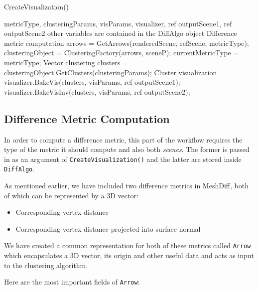 \begin{algorithm}[H]
\caption{CreateVisualization()}
\label{algo:create_vis}
\begin{algorithmic}[1]

\Require metricType, clusteringParams, visParams, visualizer, ref outputScene1, ref outputScene2 \Comment other variables are contained in the DiffAlgo object
\Statex
\Statex \Comment Difference metric computation
	\State arrows = GetArrows(renderedScene, refScene, metricType);
    \State clusteringObject = ClusteringFactory(arrows, sceneP);
    \State currentMetricType = metricType;
\EndIf
\Statex \Comment Vector clustering
\State clusters = clusteringObject.GetClusters(clusteringParams);
\Statex \Comment Cluster visualization
\State visualizer.BakeVis(clusters, visParams, ref outputScene1);
\State visualizer.BakeVisInv(clusters, visParams, ref outputScene2);
\Statex
\Return
\end{algorithmic}
\end{algorithm}

\subsection{Difference Metric Computation}
\label{subsec:implementation-algorithm-metrics}

In order to compute a difference metric, this part of the workflow requires the type of the metric it should compute and also both {\it scenes}. The former is passed in as an argument of \verb+CreateVisualization()+ and the latter are stored inside \verb+DiffAlgo+.

As mentioned earlier, we have included two difference metrics in MeshDiff, both of which can be represented by a 3D vector:

\begin{itemize}
\item Corresponding vertex distance
\item Corresponding vertex distance projected into surface normal
\end{itemize}

We have created a common representation for both of these metrics called \verb+Arrow+ which encapsulates a 3D vector, its origin and other useful data and acts as input to the clustering algorithm.

Here are the most important fields of \verb+Arrow+:

